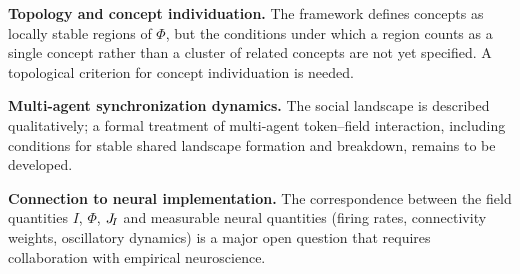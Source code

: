 \textbf{Topology and concept individuation.}
The framework defines concepts as locally stable regions of $\Phi$,
but the conditions under which a region counts as a single concept
rather than a cluster of related concepts are not yet specified.
A topological criterion for concept individuation is needed.

\textbf{Multi-agent synchronization dynamics.}
The social landscape is described qualitatively; a formal treatment
of multi-agent token--field interaction, including conditions for
stable shared landscape formation and breakdown, remains to be
developed.

\textbf{Connection to neural implementation.}
The correspondence between the field quantities $I$, $\Phi$, $J_{\!I}$
and measurable neural quantities (firing rates, connectivity weights,
oscillatory dynamics) is a major open question that requires
collaboration with empirical neuroscience.
